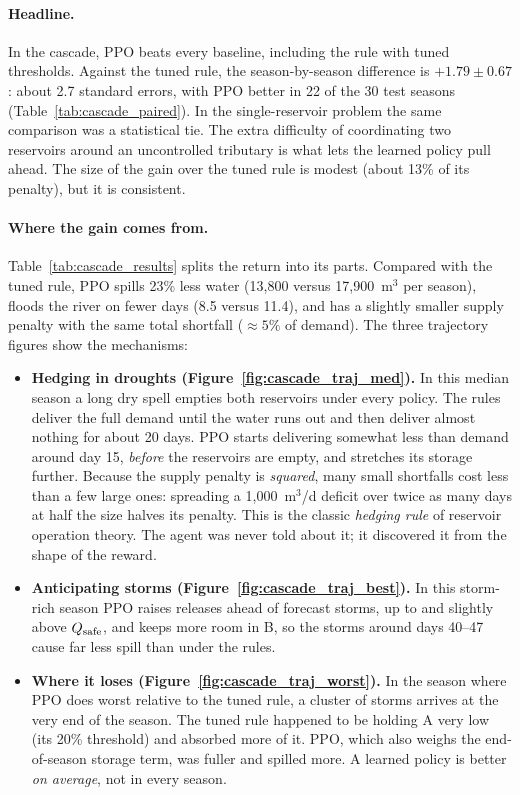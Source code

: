 \paragraph{Headline.} In the cascade, PPO beats every baseline, including
the rule with tuned thresholds. Against the tuned rule, the season-by-season
difference is $+1.79\pm0.67$: about 2.7 standard errors, with PPO better in
22 of the 30 test seasons (Table~\ref{tab:cascade_paired}). In the
single-reservoir problem the same comparison was a statistical tie. The
extra difficulty of coordinating two reservoirs around an uncontrolled
tributary is what lets the learned policy pull ahead. The size of the gain
over the tuned rule is modest (about 13\% of its penalty), but it is
consistent.

\paragraph{Where the gain comes from.} Table~\ref{tab:cascade_results}
splits the return into its parts. Compared with the tuned rule, PPO
spills 23\% less water (13{,}800 versus 17{,}900~m$^3$ per season), floods
the river on fewer days (8.5 versus 11.4), and has a slightly smaller
supply penalty with the same total shortfall ($\approx5\%$ of demand). The
three trajectory figures show the mechanisms:
\begin{itemize}
\item \textbf{Hedging in droughts (Figure~\ref{fig:cascade_traj_med}).}
In this median season a long dry spell empties both reservoirs under every
policy. The rules deliver the full demand until the water runs out and
then deliver almost nothing for about 20 days. PPO starts delivering
somewhat less than demand around day 15, \emph{before} the reservoirs are
empty, and stretches its storage further. Because the supply penalty is
\emph{squared}, many small shortfalls cost less than a few large ones:
spreading a 1{,}000~m$^3$/d deficit over twice as many days at half the
size halves its penalty. This is the classic \emph{hedging rule} of
reservoir operation theory. The agent was never told about it; it
discovered it from the shape of the reward.
\item \textbf{Anticipating storms (Figure~\ref{fig:cascade_traj_best}).}
In this storm-rich season PPO raises releases ahead of forecast storms, up
to and slightly above $Q_{\mathrm{safe}}$, and keeps more room in B, so the storms
around days 40--47 cause far less spill than under the rules.
\item \textbf{Where it loses (Figure~\ref{fig:cascade_traj_worst}).} In
the season where PPO does worst relative to the tuned rule, a cluster of
storms arrives at the very end of the season. The tuned rule happened to
be holding A very low (its 20\% threshold) and absorbed more of it. PPO,
which also weighs the end-of-season storage term, was fuller and spilled
more. A learned policy is better \emph{on average}, not in every season.
\end{itemize}

